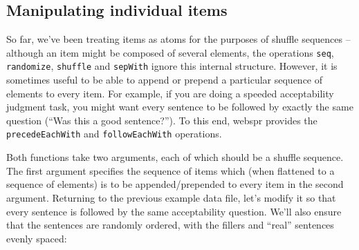 \documentclass[]{article}
\begin{document}
\subsection{Manipulating individual
items}\label{manipulating-individual-items}

So far, we've been treating items as atoms for the purposes of shuffle
sequences -- although an item might be composed of several elements, the
operations \texttt{seq}, \texttt{randomize}, \texttt{shuffle} and
\texttt{sepWith} ignore this internal structure. However, it is
sometimes useful to be able to append or prepend a particular sequence
of elements to every item. For example, if you are doing a speeded
acceptability judgment task, you might want every sentence to be
followed by exactly the same question (``Was this a good sentence?'').
To this end, webspr provides the \texttt{precedeEachWith} and
\texttt{followEachWith} operations.

Both functions take two arguments, each of which should be a shuffle
sequence. The first argument specifies the sequence of items which (when
flattened to a sequence of elements) is to be appended/prepended to
every item in the second argument. Returning to the previous example
data file, let's modify it so that every sentence is followed by the
same acceptability question. We'll also ensure that the sentences are
randomly ordered, with the fillers and ``real'' sentences evenly spaced:
\end{document}
